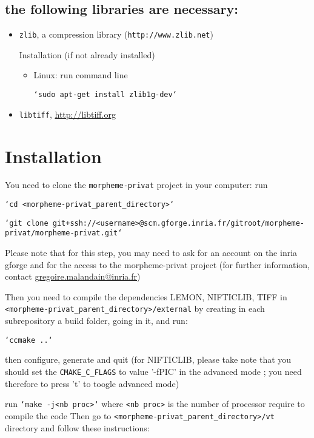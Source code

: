 \subsection{the following  libraries are necessary:}
\begin{itemize}
\item \texttt{zlib}, a compression library (\texttt{http://www.zlib.net})

Installation (if not already installed)
\begin{itemize}
\item Linux: run command line 

\texttt{`sudo apt-get install zlib1g-dev`}

\end{itemize}

\item \texttt{libtiff}, \url{http://libtiff.org}
				
\end{itemize}


\section{Installation}
      You need to clone the \texttt{morpheme-privat} project in your computer: run 
        
\texttt{`cd <morpheme-privat\_parent\_directory>`}

\texttt{`git clone git+ssh://<username>@scm.gforge.inria.fr/gitroot/morpheme-privat/morpheme-privat.git`}

        Please note that for this step, you may need to ask for an account on the inria gforge and for the access to the morpheme-privat project (for further information, contact \url{gregoire.malandain@inria.fr})
        
Then you need to compile the dependencies LEMON, NIFTICLIB, TIFF in \texttt{<morpheme-privat\_parent\_directory>/external}
by creating in each subrepository a build folder, going in it, and run:

\texttt{`ccmake ..`}

then configure, generate and quit (for NIFTICLIB, please take note that you should set the \texttt{CMAKE\_C\_FLAGS} to value '-fPIC' in the advanced mode ; you need therefore to press 't' to toogle advanced mode)

        run \texttt{`make -j<nb proc>`} where \texttt{<nb proc>} is the number of processor require to compile the code 
      Then go to \texttt{<morpheme-privat\_parent\_directory>/vt} directory and follow these instructions:

